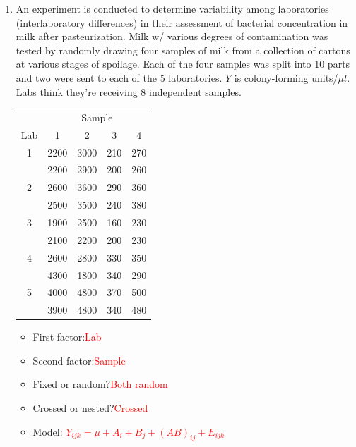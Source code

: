 \begin{enumerate}
\item An experiment is conducted to determine variability among laboratories (interlaboratory differences) in their assessment of bacterial 
concentration in milk after pasteurization.   Milk w/ various degrees of contamination was tested by randomly drawing four samples of milk from a collection of cartons at various stages of spoilage.  Each of the four samples was split into 10 parts and two were sent to each of the 5 laboratories.  $Y$ is colony-forming units/$\mu l$.  Labs think they're receiving 8 independent samples.
\begin{large}
\begin{center}
\begin{tabular}{c|cccc}
& \multicolumn{4}{c}{Sample} \\
Lab & 1 & 2 & 3 & 4 \\ \hline 
1 & 2200 & 3000 & 210 & 270 \\
  & 2200 & 2900 & 200 & 260 \\
2 & 2600 & 3600 & 290 & 360 \\
  & 2500 & 3500 & 240 & 380 \\
3 & 1900 & 2500 & 160 & 230 \\
  & 2100 & 2200 & 200 & 230 \\
4 & 2600 & 2800 & 330 & 350 \\
  & 4300 & 1800 & 340 & 290 \\
5 & 4000 & 4800 & 370 & 500 \\
  & 3900 & 4800 & 340 & 480 \\  
\end{tabular}
\end{center}
\end{large}

\begin{itemize}
\item First factor:\textcolor{red}{Lab}
\item Second factor:\textcolor{red}{Sample}
\item Fixed or random?\textcolor{red}{Both random}
\item Crossed or nested?\textcolor{red}{Crossed}
\item Model:  %
\textcolor{red}{$Y_{ijk} = \mu + A_i+B_j+(AB)_{ij} + E_{ijk}$}
\end{itemize}


\end{enumerate}
